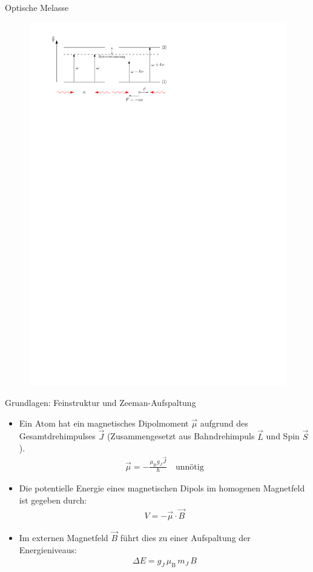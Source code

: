 \documentclass[12pt]{beamer}
\begin{document}
\begin{frame}{Optische Melasse}
\begin{figure}[h]
	\centering
	\includegraphics[width=\textwidth]{./figures/melasse.pdf}
\end{figure}
\end{frame}

\begin{frame}{Grundlagen: Feinstruktur und Zeeman-Aufspaltung}
	\begin{itemize}
		\item Ein Atom hat ein magnetisches Dipolmoment $\vec{\mu}$ aufgrund des Gesamtdrehimpulses $\vec{J}$ (Zusammengesetzt aus Bahndrehimpuls $\vec{L}$ und Spin $\vec{S}$).
		\begin{align}
		\vec{\mu} = - \frac{\mu_\mathrm{B} g_J \vec{J}}{\hbar} \quad \text{unnötig}
		\end{align}
		\item Die potentielle Energie eines magnetischen Dipols im homogenen Magnetfeld ist gegeben durch:
		\begin{align}
		V = - \vec{\mu} \cdot \vec{B}
		\end{align}
		\item Im externen Magnetfeld $\vec{B}$ führt dies zu einer Aufspaltung der Energieniveaus:
		\begin{align}
		\Delta E = g_J \, \mu_\mathrm{B} \, m_J \, B
		\end{align}
	\end{itemize}
\end{frame}
\end{document}
